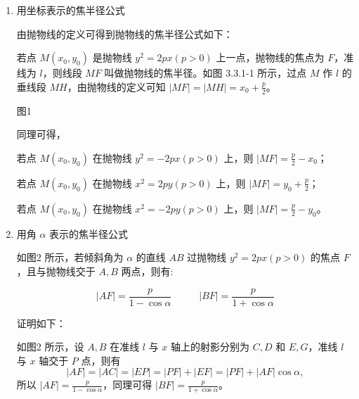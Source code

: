 \documentclass{article}
\begin{document}
\begin{enumerate}
    \item 用坐标表示的焦半径公式

    由抛物线的定义可得到抛物线的焦半径公式如下：

    若点 $M(x_0,y_0)$ 是抛物线 $y^2 = 2px(p>0)$ 上一点，抛物线的焦点为 $F$，准线为 $l$，则线段 $MF$ 叫做抛物线的焦半径。如图 3.3.1-1 所示，过点 $M$ 作 $l$ 的垂线段 $MH$，由抛物线的定义可知 $|MF| = |MH| = x_0 + \frac{p}{2}$。

    \begin{center}

    图1
    \end{center}

    同理可得，

    若点 $M(x_0,y_0)$ 在抛物线 $y^2 = -2px(p>0)$ 上，则 $|MF| = \frac{p}{2} - x_0$；

    若点 $M(x_0,y_0)$ 在抛物线 $x^2 = 2py(p>0)$ 上，则 $|MF| = y_0 + \frac{p}{2}$；

    若点 $M(x_0,y_0)$ 在抛物线 $x^2 = -2py(p>0)$ 上，则 $|MF| = \frac{p}{2} - y_0$。

    \item 用角 $\alpha$ 表示的焦半径公式

    如图2 所示，若倾斜角为 $\alpha$ 的直线 $AB$ 过抛物线 $y^2 = 2px(p>0)$ 的焦点 $F$，且与抛物线交于 $A,B$ 两点，则有:

    $$|AF| = \frac{p}{1-\cos\alpha}\;\;\;\;\;\;\;\;\;\;|BF| = \frac{p}{1+\cos\alpha}$$

    证明如下：

    如图2 所示，设 $A,B$ 在准线 $l$ 与 $x$ 轴上的射影分别为 $C,D$ 和 $E,G$，准线 $l$ 与 $x$ 轴交于 $P$ 点，则有
    $$|AF| = |AC| = |EP| = |PF| + |EF| = |PF| + |AF|\cos\alpha,$$
    所以 $|AF| = \frac{p}{1-\cos\alpha}$，同理可得 $|BF| = \frac{p}{1+\cos\alpha}$。


\end{enumerate}
\end{document}
